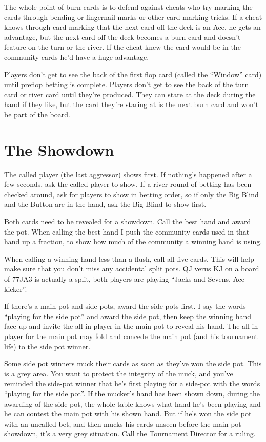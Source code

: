 The whole point of burn cards is to
defend against cheats who try marking the cards through bending or
fingernail marks or other card marking tricks.
If a cheat knows through card marking that the next card off the deck
is an Ace, he gets an advantage, but the next card off the deck
becomes a burn card and doesn't feature on the turn or the river.
If the cheat knew the card would be in the community cards he'd have a
huge advantage.


Players don't get to see the back of the first flop card (called
the ``Window'' card) until preflop betting is complete. Players
don't get to see the back of the turn card or river card until
they're produced. They can stare at the deck during the hand
if they like, but the card they're staring at is the next burn card
and won't be part of the board.

\section{The Showdown}

The called player (the last aggressor) shows first.
If nothing's happened after a few seconds, ask the called player to show.
If a river round of betting has been checked around, ask for
players to show in betting order, so if only the Big Blind and the Button
are in the hand, ask the Big Blind to show first.

Both cards need to be revealed for a showdown. Call the best
hand and award the pot. When calling the best hand I push the community
cards used in that hand up a fraction, to show how much of the community
a winning hand is using.

When calling a winning hand less than a flush, call all five cards.
This will help make sure that you don't miss any accidental split pots.
QJ verus KJ on a board of 77JA3 is actually a split, both players are
playing ``Jacks and Sevens, Ace kicker''.

If there's a main pot and side pots, award the side pots first.
I say the words ``playing for the side pot'' and award the side
pot, then keep the winning hand face up and invite the all-in
player in the main pot to reveal his hand. The all-in player
for the main pot may fold and concede the main pot (and his
tournament life) to the side pot winner.

Some side pot winners muck their cards as soon as
they've won the side pot. This is a grey area.
You want to protect the integrity of the muck, and you've reminded
the side-pot winner that he's first playing for a side-pot with the words
``playing for the side pot''.  If the mucker's hand has been
shown down, during the awarding of the side pot, the whole table knows
what hand he's been playing and he can contest the main pot with his
shown hand. But if he's won the side pot with an uncalled bet, and then mucks
his cards unseen before the main pot showdown, it's a very grey situation.
Call the Tournament Director for a ruling.

